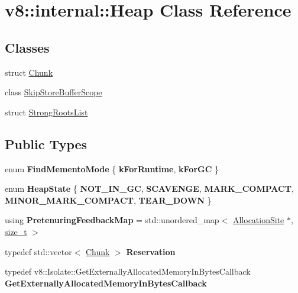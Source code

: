 \hypertarget{classv8_1_1internal_1_1Heap}{}\section{v8\+:\+:internal\+:\+:Heap Class Reference}
\label{classv8_1_1internal_1_1Heap}
\subsection*{Classes}
\begin{DoxyCompactItemize}
\item 
struct \mbox{\hyperlink{structv8_1_1internal_1_1Heap_1_1Chunk}{Chunk}}
\item 
class \mbox{\hyperlink{classv8_1_1internal_1_1Heap_1_1SkipStoreBufferScope}{Skip\+Store\+Buffer\+Scope}}
\item 
struct \mbox{\hyperlink{structv8_1_1internal_1_1Heap_1_1StrongRootsList}{Strong\+Roots\+List}}
\end{DoxyCompactItemize}
\subsection*{Public Types}
\begin{DoxyCompactItemize}
\item 
\mbox{\label{classv8_1_1internal_1_1Heap_ad6c2e89bdc7ee6a4f99cda8b86de7c04}} 
enum {\bfseries Find\+Memento\+Mode} \{ {\bfseries k\+For\+Runtime}, 
{\bfseries k\+For\+GC}
 \}
\item 
\mbox{\label{classv8_1_1internal_1_1Heap_aee3f8b2c700602c6e8546212a2ac0f65}} 
enum {\bfseries Heap\+State} \{ \newline
{\bfseries N\+O\+T\+\_\+\+I\+N\+\_\+\+GC}, 
{\bfseries S\+C\+A\+V\+E\+N\+GE}, 
{\bfseries M\+A\+R\+K\+\_\+\+C\+O\+M\+P\+A\+CT}, 
{\bfseries M\+I\+N\+O\+R\+\_\+\+M\+A\+R\+K\+\_\+\+C\+O\+M\+P\+A\+CT}, 
\newline
{\bfseries T\+E\+A\+R\+\_\+\+D\+O\+WN}
 \}
\item 
\mbox{\label{classv8_1_1internal_1_1Heap_ab5943465308981b2e69de955d046df4f}} 
using {\bfseries Pretenuring\+Feedback\+Map} = std\+::unordered\+\_\+map$<$ \mbox{\hyperlink{classv8_1_1internal_1_1AllocationSite}{Allocation\+Site}} $\ast$, \mbox{\hyperlink{classsize__t}{size\+\_\+t}} $>$
\item 
\mbox{\label{classv8_1_1internal_1_1Heap_ad8da75a5fbc6eec47a5200005fa4596e}} 
typedef std\+::vector$<$ \mbox{\hyperlink{structv8_1_1internal_1_1Heap_1_1Chunk}{Chunk}} $>$ {\bfseries Reservation}
\item 
\mbox{\label{classv8_1_1internal_1_1Heap_a2938051d563472201152b72c109bfe0b}} 
typedef v8\+::\+Isolate\+::\+Get\+Externally\+Allocated\+Memory\+In\+Bytes\+Callback {\bfseries Get\+Externally\+Allocated\+Memory\+In\+Bytes\+Callback}
\end{DoxyCompactItemize}
